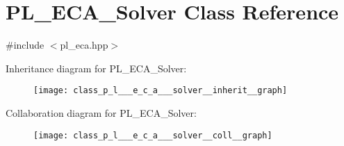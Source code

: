 \hypertarget{class_p_l___e_c_a___solver}{}\section{P\+L\+\_\+\+E\+C\+A\+\_\+\+Solver Class Reference}
\label{class_p_l___e_c_a___solver}


{\ttfamily \#include $<$pl\+\_\+eca.\+hpp$>$}



Inheritance diagram for P\+L\+\_\+\+E\+C\+A\+\_\+\+Solver\+:\nopagebreak
\begin{figure}[H]
\begin{center}
\leavevmode
\texttt{[image: class\_p\_l\_\_\_e\_c\_a\_\_\_solver\_\_inherit\_\_graph]}
\end{center}
\end{figure}


Collaboration diagram for P\+L\+\_\+\+E\+C\+A\+\_\+\+Solver\+:\nopagebreak
\begin{figure}[H]
\begin{center}
\leavevmode
\texttt{[image: class\_p\_l\_\_\_e\_c\_a\_\_\_solver\_\_coll\_\_graph]}
\end{center}
\end{figure}
